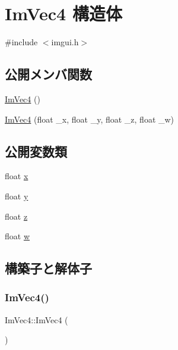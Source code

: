\hypertarget{struct_im_vec4}{}\section{Im\+Vec4 構造体}
\label{struct_im_vec4}


{\ttfamily \#include $<$imgui.\+h$>$}

\subsection*{公開メンバ関数}
\begin{DoxyCompactItemize}
\item 
\mbox{\hyperlink{struct_im_vec4_a6fba9919c960ca7eda33969d700d2a86}{Im\+Vec4}} ()
\item 
\mbox{\hyperlink{struct_im_vec4_af9e535f36b0fc7b9af0f60951fb4ffe4}{Im\+Vec4}} (float \+\_\+x, float \+\_\+y, float \+\_\+z, float \+\_\+w)
\end{DoxyCompactItemize}
\subsection*{公開変数類}
\begin{DoxyCompactItemize}
\item 
float \mbox{\hyperlink{struct_im_vec4_a2090f651f5e5b78fedae8dab87343db6}{x}}
\item 
float \mbox{\hyperlink{struct_im_vec4_a6b4d00ae261be4fe54353c759c561fe7}{y}}
\item 
float \mbox{\hyperlink{struct_im_vec4_aba6a75356917a28c967954bb29133a1a}{z}}
\item 
float \mbox{\hyperlink{struct_im_vec4_afeed5acd9f0d2043175f4da229d12a38}{w}}
\end{DoxyCompactItemize}


\subsection{構築子と解体子}
\mbox{\label{struct_im_vec4_a6fba9919c960ca7eda33969d700d2a86}} 
\subsubsection{\texorpdfstring{Im\+Vec4()}{ImVec4()}\hspace{0.1cm}{\footnotesize\ttfamily [1/2]}}
{\footnotesize\ttfamily Im\+Vec4\+::\+Im\+Vec4 (\begin{DoxyParamCaption}{ }\end{DoxyParamCaption})\hspace{0.3cm}{\ttfamily [inline]}}

